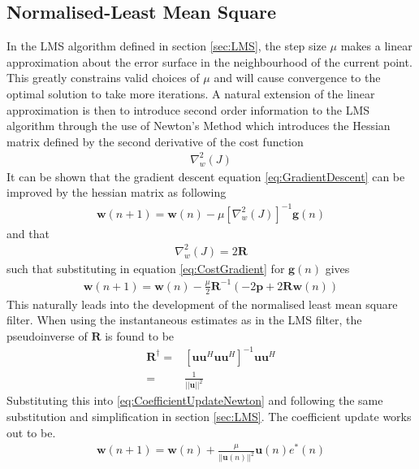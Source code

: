 \subsection{Normalised-Least Mean Square}
\label{sec:NLMS}
In the LMS algorithm defined in section \ref{sec:LMS}, %
the step size $\mu$ makes a linear approximation %
about the error surface in the neighbourhood of the %
current point. This greatly constrains valid choices %
of $\mu$ and will cause convergence to the %
optimal solution to take more iterations. %
A natural extension of the linear approximation is %
then to introduce second order information to the LMS %
algorithm through the use of Newton's Method which %
introduces the Hessian matrix defined by the second %
derivative of the cost function
\begin{align}
	\nabla_{w}^{2}(J)
\end{align}
It can be shown \cite{Hay02,Sayed03} that the %
gradient descent equation \ref{eq:GradientDescent} %
can be improved by the hessian matrix as following
\begin{align}
	\mathbf{w}(n+1) = \mathbf{w}(n) - \mu\left[\nabla_{w}^{2}(J)\right]^{-1}\mathbf{g}(n)
\end{align}
and that
\begin{align}
	\nabla_{w}^{2}(J) = 2\mathbf{R}
\end{align}
such that substituting in equation \ref{eq:CostGradient} for $\mathbf{g}(n)$ gives
\begin{align}
	\mathbf{w}(n+1) = \mathbf{w}(n) - \frac{\mu}{2}\mathbf{R}^{-1}\left(
	-2\mathbf{p} + 2\mathbf{R}\mathbf{w}(n)\right)
	\label{eq:CoefficientUpdateNewton}
\end{align}
This naturally leads into the development of the normalised %
least mean square filter. When using the instantaneous estimates %
as in the LMS filter, the pseudoinverse of $\mathbf{R}$ is found to be
\begin{align}
	\mathbf{R}^{\dagger} =& \left[\mathbf{u}\mathbf{u}^{H}
	\mathbf{u}\mathbf{u}^{H}\right]^{-1}\mathbf{u}\mathbf{u}^{H}\\
	=& \frac{1}{\lvert\lvert\mathbf{u}\rvert\rvert^{2}}
\end{align}
Substituting this into \ref{eq:CoefficientUpdateNewton} and %
following %
the same substitution and simplification in section \ref{sec:LMS}. %
The coefficient update works out to be.
\begin{align}
	\mathbf{w}(n+1) = \mathbf{w}(n) + \frac{\mu}{\lvert\lvert\mathbf{u}(n)\rvert
	\rvert^{2}}\mathbf{u}(n)e^{*}(n)
	\label{eq:NLMS}
\end{align}
